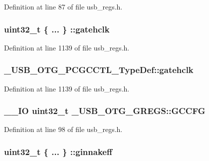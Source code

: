 Definition at line 87 of file usb\-\_\-regs.\-h.

\hypertarget{group___u_s_b___o_t_g___d_r_i_v_e_r_ga98f2a724aa4e98c5b80f44242f143689}{
\subsubsection[{gatehclk}]{\setlength{\rightskip}{0pt plus 5cm}uint32\-\_\-t \{ ... \} \-::gatehclk}}\label{group___u_s_b___o_t_g___d_r_i_v_e_r_ga98f2a724aa4e98c5b80f44242f143689}


Definition at line 1139 of file usb\-\_\-regs.\-h.

\hypertarget{group___u_s_b___o_t_g___d_r_i_v_e_r_gae554e8c7914ce8d2eb106586fdbbc76d}{
\subsubsection[{gatehclk}]{ \-\_\-\-U\-S\-B\-\_\-\-O\-T\-G\-\_\-\-P\-C\-G\-C\-C\-T\-L\-\_\-\-Type\-Def\-::gatehclk}}\label{group___u_s_b___o_t_g___d_r_i_v_e_r_gae554e8c7914ce8d2eb106586fdbbc76d}


Definition at line 1139 of file usb\-\_\-regs.\-h.

\hypertarget{group___u_s_b___o_t_g___d_r_i_v_e_r_ga6e3bfdd9ce2d01c8332866407e9e7d4e}{
\subsubsection[{G\-C\-C\-F\-G}]{\setlength{\rightskip}{0pt plus 5cm}\-\_\-\-\_\-\-I\-O {\bf uint32\-\_\-t} \-\_\-\-U\-S\-B\-\_\-\-O\-T\-G\-\_\-\-G\-R\-E\-G\-S\-::\-G\-C\-C\-F\-G}}\label{group___u_s_b___o_t_g___d_r_i_v_e_r_ga6e3bfdd9ce2d01c8332866407e9e7d4e}


Definition at line 98 of file usb\-\_\-regs.\-h.

\hypertarget{group___u_s_b___o_t_g___d_r_i_v_e_r_ga95285fa1570de7be3c9fdffd8a530800}{
\subsubsection[{ginnakeff}]{\setlength{\rightskip}{0pt plus 5cm}uint32\-\_\-t \{ ... \} \-::ginnakeff}}\label{group___u_s_b___o_t_g___d_r_i_v_e_r_ga95285fa1570de7be3c9fdffd8a530800}


